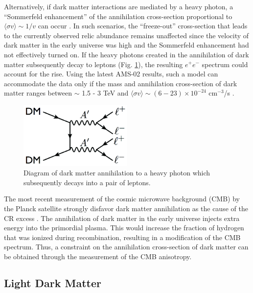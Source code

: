 Alternatively, if dark matter interactions are mediated by a heavy photon, a 
``Sommerfeld enhancement'' of the annihilation cross-section proportional to
$\langle \sigma v \rangle \sim 1/v$ can occur \cite{ArkaniHamed:2008qn}. 
In such scenarios, the
``freeze-out'' cross-section that leads to the currently observed relic
abundance remains unaffected since the velocity of dark matter in the early universe was
high and the Sommerfeld enhancement had not effectively turned on.  If the 
heavy photons created in the annihilation of dark matter subsequently decay to leptons
(Fig. \ref{fig:dm_annihilation}), the resulting $e^+e^-$ spectrum could
account for the rise.  Using the latest AMS-02 results, such a model can 
accommodate the data only if the mass and annihilation 
cross-section of dark matter ranges between $\sim$ 1.5 - 3 TeV and 
$\langle \sigma v \rangle \sim (6-23) \times 10^{-24}$ cm$^{-3}$/s 
\cite{Cholis:2013psa}. 
\begin{figure}[t]
    \centering
    \includegraphics[width=0.5\textwidth]{images/dm_annihilation.png}
    \caption{Diagram of dark matter annihilation to a heavy photon which subsequently 
             decays into a pair of leptons.}
    \label{fig:dm_annihilation}
\end{figure}

The most recent measurement of the cosmic microwave background (CMB) by the
Planck satellite strongly disfavor dark matter annihilation as the cause of 
the CR excess \cite{Ade:2015xua}.  The annihilation of dark matter in the early
universe 
injects extra energy into the primordial plasma.  This would increase the 
fraction of hydrogen that was ionized during recombination, resulting in a 
modification of the CMB spectrum.  Thus, a constraint on the annihilation 
cross-section of dark matter can be obtained through the measurement of the
CMB anisotropy.  

\subsection{Light Dark Matter}

